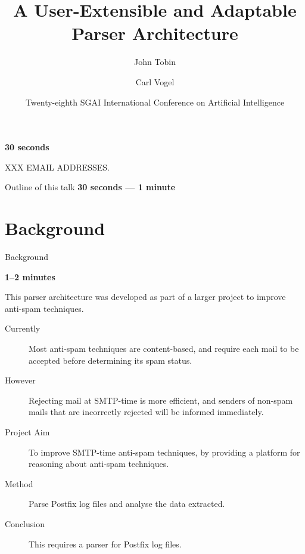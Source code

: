 \documentclass{beamer}
\title{A User-Extensible and Adaptable Parser Architecture}
\author{John Tobin \and Carl Vogel}
\institute[Trinity College]
{
  School of Computer Science and Statistics\\
  Trinity College, University of Dublin
}
\date[SGAI 2008]{Twenty-eighth SGAI International Conference on Artificial Intelligence}
\newcommand{\timingnote}[1]{%
    \textbf{#1}%
}
\begin{document}
\begin{frame}
    \timingnote{30 seconds}
    \titlepage{}
    XXX EMAIL ADDRESSES\@.
\end{frame}

\begin{frame}{Outline of this talk}
    \timingnote{30 seconds --- 1 minute}
    \tableofcontents{}
\end{frame}





\section{Background}

\begin{frame}{Background}

    \timingnote{1--2 minutes}

    This parser architecture was developed as part of a larger project to
    improve anti-spam techniques.

    \begin{description}

        \item [Currently] Most anti-spam techniques are content-based, and
            require each mail to be accepted before determining its spam
            status.

        \item [However] Rejecting mail at SMTP-time is more efficient, and
            senders of non-spam mails that are incorrectly rejected will be
            informed immediately.

        \item [Project Aim] To improve SMTP-time anti-spam techniques, by
            providing a platform for reasoning about anti-spam techniques.

        \item [Method] Parse Postfix log files and analyse the data
            extracted.

        \item [Conclusion] This requires a parser for Postfix log files.

    \end{description}

\end{frame}
\end{document}
